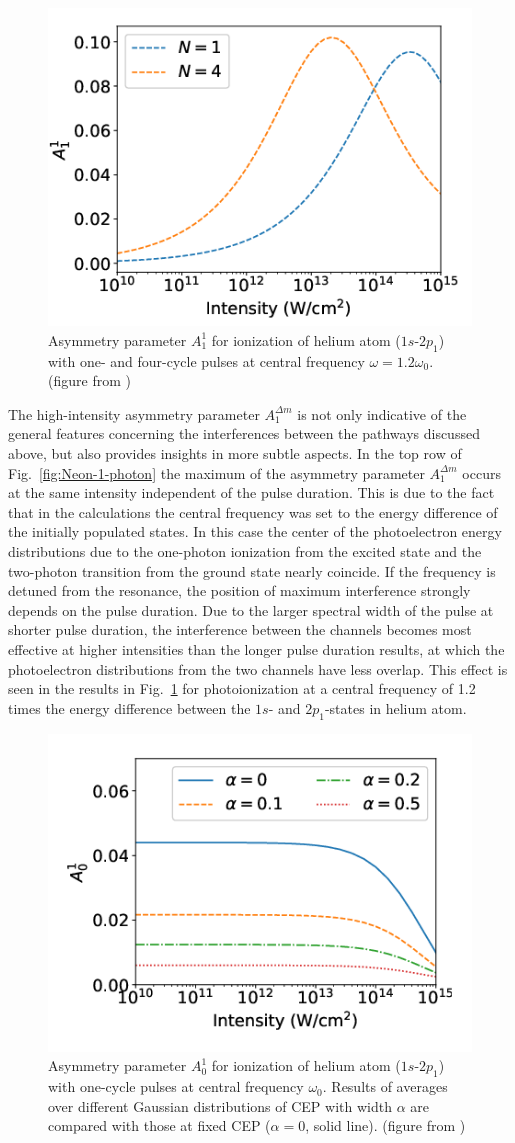 \begin{figure}[!ht]
\centering
\includegraphics[width=.45\linewidth]{figs/Photo_ionization/GAP/He_2p1_detune_1p2.png}
\caption{ 
Asymmetry parameter $A_1^1$ for ionization of helium atom ($1s$-$2p_1$) with one- and four-cycle pulses at central frequency 
$\omega=1.2\omega_0$. (figure from \cite{venzke2020_GAP})
} 
  \label{fig:detuned_GAP}
\end{figure}

The high-intensity asymmetry parameter $A_1^{\Delta m}$ is not only indicative of the general features concerning the interferences between the pathways discussed above, but also provides insights in more subtle aspects. In the top row of Fig.~\ref{fig:Neon-1-photon} the maximum of the asymmetry parameter $A_1^{\Delta m}$ occurs at the same intensity independent of the pulse duration. This is due to the fact that in the calculations the central frequency was set to the energy difference of the initially populated states. In this case the center of the photoelectron energy distributions due to the one-photon ionization from the excited state and the two-photon transition from the ground state nearly coincide. If the frequency is detuned from the resonance, the position of maximum interference strongly depends on the pulse duration. Due to the larger spectral width of the pulse at shorter pulse duration, the interference between the channels becomes most effective at higher intensities than the longer pulse duration results, at which the photoelectron distributions from the two channels have less overlap. This effect is seen in the results in Fig.\ \ref{fig:detuned_GAP} for photoionization at a central frequency of 1.2 times the energy difference between the $1s$- and $2p_1$-states in helium atom. 

\begin{figure}[!ht]
\centering
\includegraphics[width=.45\linewidth]{figs/Photo_ionization/GAP/He_2p1_asym_alpha.png}
\caption{
Asymmetry parameter $A_0^1$ for ionization of helium atom ($1s$-$2p_1$) with one-cycle pulses at central frequency $\omega_0$. Results of averages over different Gaussian distributions of CEP with width $\alpha$ are compared with those at fixed CEP ($\alpha =0$, solid line). (figure from \cite{venzke2020_GAP})
} 
  \label{fig:cep_avg}
\end{figure}

